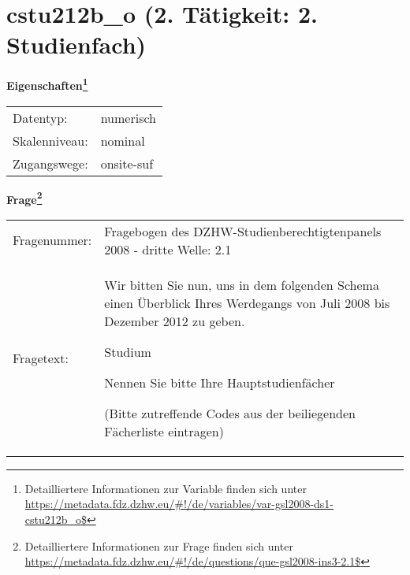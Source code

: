 
    \setcounter{footnote}{0}

    \vspace*{-1.8cm}
	\section{cstu212b\_o (2. Tätigkeit: 2. Studienfach)}
	\label{section:cstu212b_o}



    \vspace*{0.5cm}
    \noindent\textbf{Eigenschaften\footnote{Detailliertere Informationen zur Variable finden sich unter
		\url{https://metadata.fdz.dzhw.eu/\#!/de/variables/var-gsl2008-ds1-cstu212b_o$}}}\\
	\begin{tabularx}{\hsize}{@{}lX}
	Datentyp: & numerisch \\
	Skalenniveau: & nominal \\
	Zugangswege: &
	  onsite-suf
 \\
    \end{tabularx}



				\vspace*{0.5cm}
                \noindent\textbf{Frage\footnote{Detailliertere Informationen zur Frage finden sich unter
		              \url{https://metadata.fdz.dzhw.eu/\#!/de/questions/que-gsl2008-ins3-2.1$}}}\\
				\begin{tabularx}{\hsize}{@{}lX}
					Fragenummer: &
					  Fragebogen des DZHW-Studienberechtigtenpanels 2008 - dritte Welle:
					  2.1
 \\
					Fragetext: & Wir bitten Sie nun, uns in dem folgenden Schema einen Überblick Ihres Werdegangs von Juli 2008 bis Dezember 2012 zu geben.\par  Studium\par  Nennen Sie bitte Ihre Hauptstudienfächer\par  (Bitte zutreffende Codes aus der beiliegenden Fächerliste eintragen) \\
				\end{tabularx}





